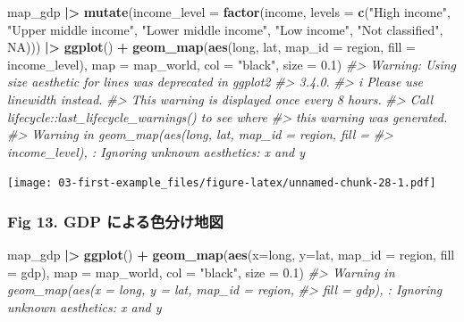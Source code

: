 \documentclass[
  xelatex, ja=standard]{bxjsbook}
\newenvironment{Shaded}{\begin{snugshade}}{\end{snugshade}}
\newcommand{\AttributeTok}[1]{\textcolor[rgb]{0.13,0.29,0.53}{#1}}
\newcommand{\CommentTok}[1]{\textcolor[rgb]{0.56,0.35,0.01}{\textit{#1}}}
\newcommand{\ConstantTok}[1]{\textcolor[rgb]{0.56,0.35,0.01}{#1}}
\newcommand{\FloatTok}[1]{\textcolor[rgb]{0.00,0.00,0.81}{#1}}
\newcommand{\FunctionTok}[1]{\textcolor[rgb]{0.13,0.29,0.53}{\textbf{#1}}}
\newcommand{\NormalTok}[1]{#1}
\newcommand{\SpecialCharTok}[1]{\textcolor[rgb]{0.81,0.36,0.00}{\textbf{#1}}}
\newcommand{\StringTok}[1]{\textcolor[rgb]{0.31,0.60,0.02}{#1}}
\theoremstyle{definition}
\theoremstyle{definition}
\theoremstyle{definition}
\theoremstyle{definition}
\theoremstyle{remark}
\begin{document}
\begin{Shaded}
\begin{Highlighting}[]
\NormalTok{map\_gdp }\SpecialCharTok{|\textgreater{}} \FunctionTok{mutate}\NormalTok{(}\AttributeTok{income\_level =} \FunctionTok{factor}\NormalTok{(income, }\AttributeTok{levels =} \FunctionTok{c}\NormalTok{(}\StringTok{"High income"}\NormalTok{, }\StringTok{"Upper middle income"}\NormalTok{, }\StringTok{"Lower middle income"}\NormalTok{, }\StringTok{"Low income"}\NormalTok{, }\StringTok{"Not classified"}\NormalTok{, }\ConstantTok{NA}\NormalTok{))) }\SpecialCharTok{|\textgreater{}}
  \FunctionTok{ggplot}\NormalTok{() }\SpecialCharTok{+}
  \FunctionTok{geom\_map}\NormalTok{(}\FunctionTok{aes}\NormalTok{(long, lat, }\AttributeTok{map\_id =}\NormalTok{ region, }\AttributeTok{fill =}\NormalTok{ income\_level), }\AttributeTok{map =}\NormalTok{ map\_world, }\AttributeTok{col =} \StringTok{"black"}\NormalTok{, }\AttributeTok{size =} \FloatTok{0.1}\NormalTok{) }
\CommentTok{\#\textgreater{} Warning: Using \textasciigrave{}size\textasciigrave{} aesthetic for lines was deprecated in ggplot2}
\CommentTok{\#\textgreater{} 3.4.0.}
\CommentTok{\#\textgreater{} i Please use \textasciigrave{}linewidth\textasciigrave{} instead.}
\CommentTok{\#\textgreater{} This warning is displayed once every 8 hours.}
\CommentTok{\#\textgreater{} Call \textasciigrave{}lifecycle::last\_lifecycle\_warnings()\textasciigrave{} to see where}
\CommentTok{\#\textgreater{} this warning was generated.}
\CommentTok{\#\textgreater{} Warning in geom\_map(aes(long, lat, map\_id = region, fill =}
\CommentTok{\#\textgreater{} income\_level), : Ignoring unknown aesthetics: x and y}
\end{Highlighting}
\end{Shaded}

\texttt{[image: 03-first-example\_files/figure-latex/unnamed-chunk-28-1.pdf]}

\hypertarget{fig-13.-gdp-ux306bux3088ux308bux8272ux5206ux3051ux5730ux56f3}{%
\subsubsection{Fig 13. GDP による色分け地図}\label{fig-13.-gdp-ux306bux3088ux308bux8272ux5206ux3051ux5730ux56f3}}

\begin{Shaded}
\begin{Highlighting}[]
\NormalTok{map\_gdp }\SpecialCharTok{|\textgreater{}}
  \FunctionTok{ggplot}\NormalTok{() }\SpecialCharTok{+}
  \FunctionTok{geom\_map}\NormalTok{(}\FunctionTok{aes}\NormalTok{(}\AttributeTok{x=}\NormalTok{long, }\AttributeTok{y=}\NormalTok{lat, }\AttributeTok{map\_id =}\NormalTok{ region, }\AttributeTok{fill =}\NormalTok{ gdp), }\AttributeTok{map =}\NormalTok{ map\_world, }\AttributeTok{col =} \StringTok{"black"}\NormalTok{, }\AttributeTok{size =} \FloatTok{0.1}\NormalTok{) }
\CommentTok{\#\textgreater{} Warning in geom\_map(aes(x = long, y = lat, map\_id = region,}
\CommentTok{\#\textgreater{} fill = gdp), : Ignoring unknown aesthetics: x and y}
\end{Highlighting}
\end{Shaded}
\end{document}
